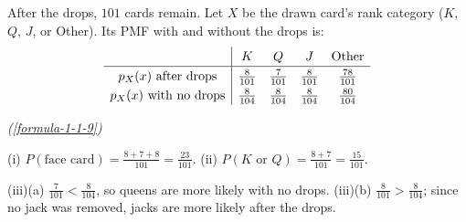 \begin{enumerate}[label={},font=\normalfont,leftmargin=1.15cm,labelwidth=1.0cm,labelsep=0.15cm,itemindent=0pt,listparindent=0pt,parsep=0pt,topsep=0pt]
\vspace{0.6em}\par\solution


After the drops, $101$ cards remain. Let $X$ be the drawn card's rank category ($K$, $Q$, $J$, or Other). Its PMF with and without the drops is:
\[\begingroup\renewcommand{\arraystretch}{1.25}
\begin{array}{c|cccc}
&K&Q&J&\text{Other}\\\hline
p_X(x)\text{ after drops}&\frac{8}{101}&\frac{7}{101}&\frac{8}{101}&\frac{78}{101}\\
p_X(x)\text{ with no drops}&\frac{8}{104}&\frac{8}{104}&\frac{8}{104}&\frac{80}{104}
\end{array}\endgroup
\]
\par\noindent\hfill\mbox{\textit{(\ref{formula-1-1-9})}}\par
(i) $P(\text{face card})=\frac{8+7+8}{101}=\frac{23}{101}$. (ii) $P(K\text{ or }Q)=\frac{8+7}{101}=\frac{15}{101}$.

(iii)(a) $\frac{7}{101}<\frac{8}{104}$, so queens are more likely with no drops. (iii)(b) $\frac{8}{101}>\frac{8}{104}$; since no jack was removed, jacks are more likely after the drops.

\end{enumerate}
